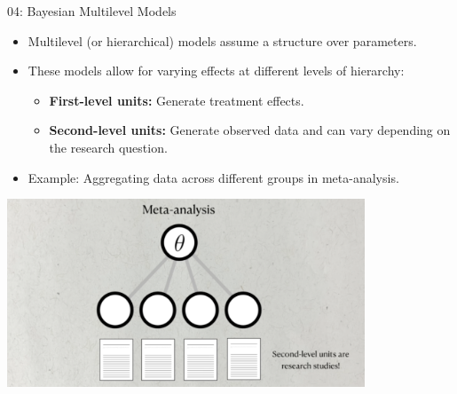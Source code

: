 \documentclass{beamer}
\begin{document}
\begin{frame}{04: Bayesian Multilevel Models}
\begin{itemize}
    \item Multilevel (or hierarchical) models assume a structure over parameters.
    \item These models allow for varying effects at different levels of hierarchy:
    \begin{itemize}
        \item \textbf{First-level units:} Generate treatment effects.
        \item \textbf{Second-level units:} Generate observed data and can vary depending on the research question.
    \end{itemize}
    \item Example: Aggregating data across different groups in meta-analysis.
\end{itemize}

\begin{center}
    \includegraphics[width=0.8\textwidth]{meta_analysis.png}
\end{center}
\end{frame}
\end{document}
